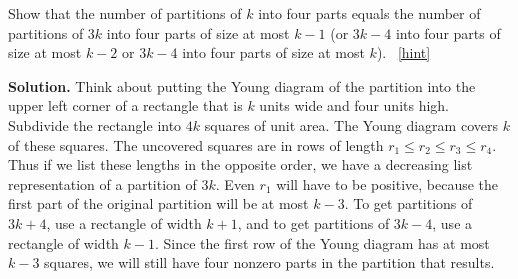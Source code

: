 \documentclass{book}
\begin{document}
\setcounter{project}{307}
\addtocounter{project}{-1}
\begin{activity}[]\label{rectanglecomplement}
\hypertarget{p-1586}{}%
Show that the number of partitions of \(k\) into four parts equals the number of partitions of \(3k\) into four parts of size at most \(k-1\) (or \(3k-4\) into four parts of size at most \(k-2\) or \(3k-4\) into four parts of size at most \(k\)).%
~\hfill{\tiny\hyperlink{a-307}{[hint]}\hypertarget{q-307}{}}\par\smallskip%
\noindent\textbf{Solution.}\hypertarget{solution-235}{}\quad%
\hypertarget{p-1588}{}%
Think about putting the Young diagram of the partition into the upper left corner of a rectangle that is \(k\) units wide and four units high. Subdivide the rectangle into \(4k\) squares of unit area. The Young diagram covers \(k\) of these squares. The uncovered squares are in rows of length \(r_1\le r_2\le r_3\le r_4\). Thus if we list these lengths in the opposite order, we have a decreasing list representation of a partition of \(3k\). Even \(r_1\) will have to be positive, because the first part of the original partition will be at most \(k-3\). To get partitions of \(3k+4\), use a rectangle of width \(k+1\), and to get partitions of \(3k-4\), use a rectangle of width \(k-1\). Since the first row of the Young diagram has at most \(k-3\) squares, we will still have four nonzero parts in the partition that results.%
\end{activity}
\end{document}

